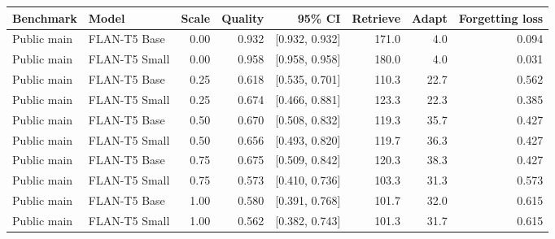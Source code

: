 \begin{tabular}{llrrrrrr}
\toprule
Benchmark & Model & Scale & Quality & 95\% CI & Retrieve & Adapt & Forgetting loss \\
\midrule
Public main & FLAN-T5 Base & 0.00 & 0.932 & [0.932, 0.932] & 171.0 & 4.0 & 0.094 \\
Public main & FLAN-T5 Small & 0.00 & 0.958 & [0.958, 0.958] & 180.0 & 4.0 & 0.031 \\
Public main & FLAN-T5 Base & 0.25 & 0.618 & [0.535, 0.701] & 110.3 & 22.7 & 0.562 \\
Public main & FLAN-T5 Small & 0.25 & 0.674 & [0.466, 0.881] & 123.3 & 22.3 & 0.385 \\
Public main & FLAN-T5 Base & 0.50 & 0.670 & [0.508, 0.832] & 119.3 & 35.7 & 0.427 \\
Public main & FLAN-T5 Small & 0.50 & 0.656 & [0.493, 0.820] & 119.7 & 36.3 & 0.427 \\
Public main & FLAN-T5 Base & 0.75 & 0.675 & [0.509, 0.842] & 120.3 & 38.3 & 0.427 \\
Public main & FLAN-T5 Small & 0.75 & 0.573 & [0.410, 0.736] & 103.3 & 31.3 & 0.573 \\
Public main & FLAN-T5 Base & 1.00 & 0.580 & [0.391, 0.768] & 101.7 & 32.0 & 0.615 \\
Public main & FLAN-T5 Small & 1.00 & 0.562 & [0.382, 0.743] & 101.3 & 31.7 & 0.615 \\
\bottomrule
\end{tabular}
